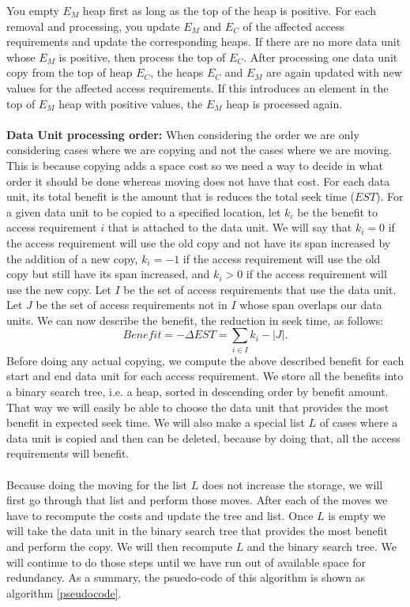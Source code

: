  You empty $E_M$ heap first as long as the top of the heap is positive. For each removal and processing, you update $E_M$ and $E_C$ of the affected access requirements and update the corresponding heaps. If there are no more data unit whose $E_M$ is positive, then process the top of $E_C$. After processing one data unit copy from the top of heap $E_C$, the heaps $E_C$ and $E_M$ are again updated with new values for the affected access requirements. If this introduces an element in the top of $E_M$ heap with positive values, the $E_M$ heap is processed again.\\
\\
{\bf Data Unit processing order:} 
 When considering the order we are only considering cases where we are copying and not the cases where we are moving. This is because copying adds a space cost so we need a way to decide in what order it should be done whereas moving does not have that cost. For each data
unit, its total benefit is the amount that is reduces the total seek time
($EST$). For a given data unit to be copied to a specified location, let $k_i$
be the benefit to access requirement $i$ that is attached to the data unit. We
will say that $k_i=0$ if the access requirement will use the old copy and not have its span increased by the addition of a new copy, $k_i=-1$ if the access requirement will use the old copy but still have its span increased, and
$k_i>0$ if the access requirement will use the new copy. Let $I$ be the set of
access requirements that use the data unit. Let $J$ be the set of access
requirements not in $I$ whose span overlaps our data units. We can now describe
the benefit, the reduction in seek time, as follows:
\[
Benefit = -\Delta EST = \sum_{i \in I} k_i - |J|.
\]
Before doing any actual copying, we compute the above described benefit for
each start and end data unit for each access requirement. We store all the
benefits into a binary search tree, i.e. a heap, sorted in descending order by benefit
amount. That way we will easily be able to choose the data unit that provides
the most benefit in expected seek time. We will also make a special list $L$ of
cases where a data unit is copied and then can be deleted, because by doing
that, all the access
requirements will benefit. \\
\\
Because doing the moving for the list $L$ does not increase the storage, we will first go through that list and perform those moves. After each of the moves we have to recompute the costs and update the tree and list. Once $L$ is empty we will take the data unit in the binary search tree that provides the most benefit and perform the copy. We will then recompute $L$ and the binary search tree. We will continue to do those steps until we have run out of available space for redundancy. As a summary, the psuedo-code of this algorithm is shown as algorithm \ref{pseudocode}.

